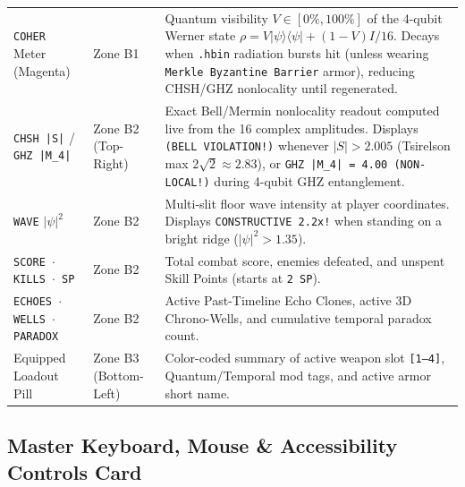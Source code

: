 \documentclass[10pt,letterpaper]{article}
\begin{document}
\begin{table}[!ht]
\begin{tabularx}{\textwidth}{@{} L{3.6cm} L{2.3cm} Y @{}}
\texttt{COHER} Meter (Magenta) & Zone B1 & Quantum visibility $V \in [0\%, 100\%]$ of the 4-qubit Werner state $\rho = V|\psi\rangle\langle\psi| + (1-V)I/16$. Decays when \texttt{.hbin} radiation bursts hit (unless wearing \texttt{Merkle Byzantine Barrier} armor), reducing CHSH/GHZ nonlocality until regenerated. \\
\texttt{CHSH |S|} / \texttt{GHZ |M\_4|} & Zone B2 (Top-Right) & Exact Bell/Mermin nonlocality readout computed live from the 16 complex amplitudes. Displays \texttt{(BELL VIOLATION!)} whenever $|S| > 2.005$ (Tsirelson max $2\sqrt{2}\approx 2.83$), or \texttt{GHZ |M\_4| = 4.00 (NON-LOCAL!)} during 4-qubit GHZ entanglement. \\
\texttt{WAVE} $|\psi|^2$ & Zone B2 & Multi-slit floor wave intensity at player coordinates. Displays \texttt{CONSTRUCTIVE 2.2x!} when standing on a bright ridge ($|\psi|^2 > 1.35$). \\
\texttt{SCORE $\cdot$ KILLS $\cdot$ SP} & Zone B2 & Total combat score, enemies defeated, and unspent Skill Points (starts at \texttt{2 SP}). \\
\texttt{ECHOES $\cdot$ WELLS $\cdot$ PARADOX} & Zone B2 & Active Past-Timeline Echo Clones, active 3D Chrono-Wells, and cumulative temporal paradox count. \\
Equipped Loadout Pill & Zone B3 (Bottom-Left) & Color-coded summary of active weapon slot \texttt{[1--4]}, Quantum/Temporal mod tags, and active armor short name. \\
\bottomrule
\end{tabularx}
\end{table}

\FloatBarrier
\subsection{Master Keyboard, Mouse \& Accessibility Controls Card}
\label{sec:controls}
\end{document}
